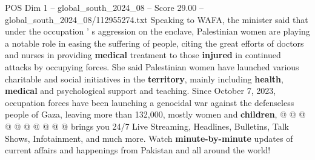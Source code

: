 \begin{textsample}{POS Dim 1 – global\_south\_2024\_08 – Score 29.00 – global\_south\_2024\_08/112955274.txt}
Speaking to WAFA, the minister said that under the occupation ' s aggression on the enclave, Palestinian women are playing a notable role in easing the suffering of people, citing the great efforts of doctors and nurses in providing \textbf{medical} treatment to those \textbf{injured} in continued attacks by occupying forces.
She said Palestinian women have launched various charitable and social initiatives in the \textbf{territory}, mainly including \textbf{health}, \textbf{medical} and psychological support and teaching.
Since October 7, 2023, occupation forces have been launching a genocidal war against the defenseless people of Gaza, leaving more than 132,000, mostly women and \textbf{children}, @ @ @ @ @ @ @ @ @ @ brings you 24/7 Live Streaming, Headlines, Bulletins, Talk Shows, Infotainment, and much more.
Watch \textbf{minute-by-minute} updates of current affairs and happenings from Pakistan and all around the world!

\end{textsample}
